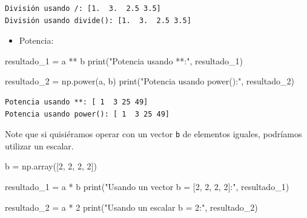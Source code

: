 \documentclass[
  letterpaper,
  DIV=11,
  numbers=noendperiod]{scrreprt}
\newenvironment{Shaded}{\begin{snugshade}}{\end{snugshade}}
\newcommand{\BuiltInTok}[1]{\textcolor[rgb]{0.00,0.23,0.31}{#1}}
\newcommand{\DecValTok}[1]{\textcolor[rgb]{0.68,0.00,0.00}{#1}}
\newcommand{\NormalTok}[1]{\textcolor[rgb]{0.00,0.23,0.31}{#1}}
\newcommand{\OperatorTok}[1]{\textcolor[rgb]{0.37,0.37,0.37}{#1}}
\newcommand{\StringTok}[1]{\textcolor[rgb]{0.13,0.47,0.30}{#1}}
\providecommand{\tightlist}{%
  \setlength{\itemsep}{0pt}\setlength{\parskip}{0pt}}\usepackage{longtable,booktabs,array}
\begin{document}
\begin{verbatim}
División usando /: [1.  3.  2.5 3.5]
División usando divide(): [1.  3.  2.5 3.5]
\end{verbatim}

\begin{itemize}
\tightlist
\item
  Potencia:
\end{itemize}

\begin{Shaded}
\begin{Highlighting}[]
\NormalTok{resultado\_1 }\OperatorTok{=}\NormalTok{ a }\OperatorTok{**}\NormalTok{ b}
\BuiltInTok{print}\NormalTok{(}\StringTok{"Potencia usando **:"}\NormalTok{, resultado\_1) }

\NormalTok{resultado\_2 }\OperatorTok{=}\NormalTok{ np.power(a, b)}
\BuiltInTok{print}\NormalTok{(}\StringTok{"Potencia usando power():"}\NormalTok{, resultado\_2) }
\end{Highlighting}
\end{Shaded}

\begin{verbatim}
Potencia usando **: [ 1  3 25 49]
Potencia usando power(): [ 1  3 25 49]
\end{verbatim}

\begin{tcolorbox}[enhanced jigsaw, arc=.35mm, toptitle=1mm, colframe=quarto-callout-note-color-frame, bottomtitle=1mm, opacitybacktitle=0.6, colbacktitle=quarto-callout-note-color!10!white, leftrule=.75mm, coltitle=black, toprule=.15mm, titlerule=0mm, title=\textcolor{quarto-callout-note-color}{\faInfo}\hspace{0.5em}{Note}, bottomrule=.15mm, rightrule=.15mm, colback=white, breakable, opacityback=0, left=2mm]

Note que si quisiéramos operar con un vector \texttt{b} de elementos
iguales, podríamos utilizar un escalar.

\end{tcolorbox}

\begin{Shaded}
\begin{Highlighting}[]
\NormalTok{b }\OperatorTok{=}\NormalTok{ np.array([}\DecValTok{2}\NormalTok{, }\DecValTok{2}\NormalTok{, }\DecValTok{2}\NormalTok{, }\DecValTok{2}\NormalTok{])}

\NormalTok{resultado\_1 }\OperatorTok{=}\NormalTok{ a }\OperatorTok{*}\NormalTok{ b}
\BuiltInTok{print}\NormalTok{(}\StringTok{"Usando un vector b = [2, 2, 2, 2]:"}\NormalTok{, resultado\_1) }

\NormalTok{resultado\_2 }\OperatorTok{=}\NormalTok{ a }\OperatorTok{*} \DecValTok{2}
\BuiltInTok{print}\NormalTok{(}\StringTok{"Usando un escalar b = 2:"}\NormalTok{, resultado\_2) }
\end{Highlighting}
\end{Shaded}
\end{document}
